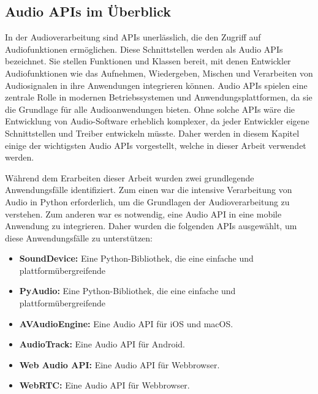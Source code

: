 \documentclass[11pt,a4paper]{article}
\begin{document}
\subsection{Audio APIs im Überblick}
In der Audioverarbeitung sind APIs unerlässlich, die den Zugriff auf Audiofunktionen ermöglichen. 
Diese Schnittstellen werden als Audio APIs bezeichnet. Sie stellen Funktionen und Klassen bereit, 
mit denen Entwickler Audiofunktionen wie das Aufnehmen, Wiedergeben, Mischen und Verarbeiten von 
Audiosignalen in ihre Anwendungen integrieren können. Audio APIs spielen eine zentrale Rolle in 
modernen Betriebssystemen und Anwendungsplattformen, da sie die Grundlage für alle Audioanwendungen 
bieten. Ohne solche APIs wäre die Entwicklung von Audio-Software erheblich komplexer, da jeder 
Entwickler eigene Schnittstellen und Treiber entwickeln müsste. Daher werden in diesem Kapitel 
einige der wichtigsten Audio APIs vorgestellt, welche in dieser Arbeit verwendet werden.


\noindent
\newline
Während dem Erarbeiten dieser Arbeit wurden zwei grundlegende Anwendungsfälle identifiziert. Zum 
einen war die intensive Verarbeitung von Audio in Python erforderlich, um die Grundlagen der
Audioverarbeitung zu verstehen. Zum anderen war es notwendig, eine Audio API in eine mobile 
Anwendung zu integrieren. Daher wurden die folgenden APIs ausgewählt, um diese Anwendungsfälle zu
unterstützen:

\begin{itemize}
    \item \textbf{SoundDevice:} Eine Python-Bibliothek, die eine einfache und plattformübergreifende
    \item \textbf{PyAudio:} Eine Python-Bibliothek, die eine einfache und plattformübergreifende
    \item \textbf{AVAudioEngine:} Eine Audio API für iOS und macOS.
    \item \textbf{AudioTrack:} Eine Audio API für Android.
    \item \textbf{Web Audio API:} Eine Audio API für Webbrowser.
    \item \textbf{WebRTC:} Eine Audio API für Webbrowser.
\end{itemize}
\end{document}
